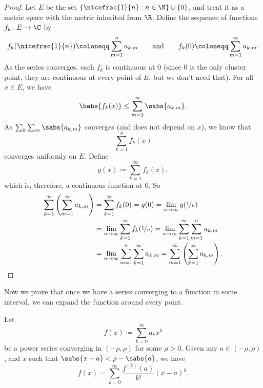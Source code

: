 \begin{proof}
Let $E$ be the set $\{ \nicefrac{1}{n} : n \in \N \} \cup \{ 0 \}$,
and treat it as a metric space with the metric inherited from $\R$.
Define the sequence of functions $f_k \colon E \to \C$
by
\begin{equation*}
f_k(\nicefrac{1}{n}) \coloneqq \sum_{m=1}^n a_{k,m}
\qquad
\text{and}
\qquad
f_k(0) \coloneqq \sum_{m=1}^\infty a_{k,m} .
\end{equation*}
As the series converges, each $f_k$ is continuous at $0$
(since 0 is the only cluster point, they are continuous at every point of
$E$, but we don't need that).
For all $x \in E$, we have
\begin{equation*}
\babs{f_k(x)} \leq \sum_{m=1}^\infty \sabs{a_{k,m}} .
\end{equation*}
As $\sum_k \sum_m \sabs{a_{k,m}}$ converges (and does not depend on
$x$), we know that
\begin{equation*}
\sum_{k=1}^n f_k(x)
\end{equation*}
converges uniformly on $E$.  Define
\begin{equation*}
g(x) \coloneqq \sum_{k=1}^\infty f_k(x) ,
\end{equation*}
which is, therefore, a continuous function at $0$.
So
\begin{equation*}
\begin{split}
\sum_{k=1}^\infty \left( \sum_{m=1}^\infty a_{k,m} \right)
& =
\sum_{k=1}^\infty f_k(0)
= g(0)
= \lim_{n\to\infty} g(\nicefrac{1}{n}) \\
&= 
\lim_{n\to\infty}\sum_{k=1}^\infty f_k(\nicefrac{1}{n})
= 
\lim_{n\to\infty}\sum_{k=1}^\infty \sum_{m=1}^n a_{k,m} \\
&= 
\lim_{n\to\infty}\sum_{m=1}^n \sum_{k=1}^\infty a_{k,m}
= 
\sum_{m=1}^\infty \left( \sum_{k=1}^\infty a_{k,m} \right) . \qedhere
\end{split}
\end{equation*}
\end{proof}

Now we prove that once we have a series converging to a function
in some interval, we can expand the function around every point.

\begin{thm}
%
\label{thm:tayloranal}
Let
\begin{equation*}
f(x) \coloneqq \sum_{k=0}^\infty a_k x^k
\end{equation*}
be a power series converging in $(-\rho,\rho)$ for some $\rho > 0$.  Given any $a \in
(-\rho,\rho)$,
and $x$ such that $\sabs{x-a} < \rho-\sabs{a}$, we have
\begin{equation*}
f(x) =
\sum_{k=0}^\infty \frac{f^{(k)}(a)}{k!} {(x-a)}^{k} .
\end{equation*}
\end{thm}

